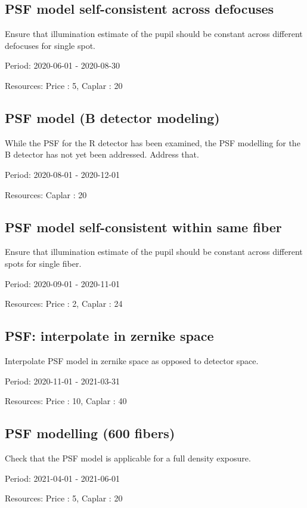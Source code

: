 \subsection{PSF model self-consistent across defocuses}

Ensure that illumination estimate of the pupil should be constant across different defocuses for single spot.

Period: 2020-06-01 - 2020-08-30

Resources: Price : 5, Caplar : 20

\subsection{PSF model (B detector modeling)}

While the PSF for the R detector has been examined, the PSF modelling for the B detector has not yet been addressed. Address that.

Period: 2020-08-01 - 2020-12-01

Resources: Caplar : 20

\subsection{PSF model self-consistent within same fiber}

Ensure that illumination estimate of the pupil should be constant across different spots for single fiber.

Period: 2020-09-01 - 2020-11-01

Resources: Price : 2, Caplar : 24

\subsection{PSF: interpolate in zernike space}

Interpolate PSF model in zernike space as opposed to detector space.

Period: 2020-11-01 - 2021-03-31

Resources: Price : 10, Caplar : 40

\subsection{PSF modelling (600 fibers)}

Check that the PSF model is applicable for a full density exposure.

Period: 2021-04-01 - 2021-06-01

Resources: Price : 5, Caplar : 20

